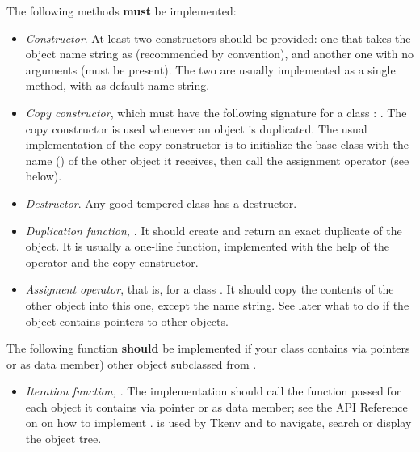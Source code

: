 The following methods \textbf{must} be implemented:

\begin{itemize}
  \item{\textit{Constructor}. At least two constructors should be provided:
        one that takes the object name string as 
        (recommended by convention), and another one with no arguments
        (must be present). The two are usually implemented as a single
        method, with  as default name string.}
  \item{\textit{Copy constructor}, which must have the following signature
        for a class : . The copy constructor is used
        whenever an object is duplicated. The usual implementation of
        the copy constructor is to initialize the base class with the
        name () of the other object it receives, then call the
        assignment operator (see below).}
  \item{\textit{Destructor}. Any good-tempered class has a destructor.}
  \item{\textit{Duplication function,} .
        It should create and return an exact duplicate of the object.
        It is usually a one-line function, implemented with the help
        of the  operator and the copy constructor.}
  \item{\textit{Assigment operator}, that is, 
        for a class . It should copy the contents of the other
        object into this one, except the name string. See later what to do
        if the object contains pointers to other objects.}
\end{itemize}

The following function \textbf{should} be implemented if your class contains
via pointers or as data member) other object subclassed from .

\begin{itemize}
  \item{\textit{Iteration function,} .
        The implementation should call the function passed
        for each object it contains via pointer or
        as data member; see the API Reference on  on how to
        implement .  is used by Tkenv and
         to navigate, search or display the object tree.}
\end{itemize}

